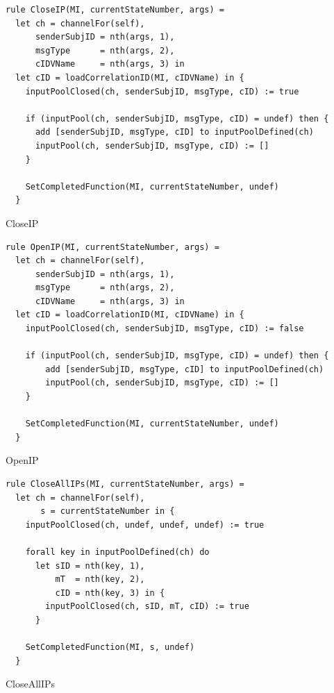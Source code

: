 \begin{listing}[H]
\begin{verbatim}
rule CloseIP(MI, currentStateNumber, args) =
  let ch = channelFor(self),
      senderSubjID = nth(args, 1),
      msgType      = nth(args, 2),
      cIDVName     = nth(args, 3) in
  let cID = loadCorrelationID(MI, cIDVName) in {
    inputPoolClosed(ch, senderSubjID, msgType, cID) := true

    if (inputPool(ch, senderSubjID, msgType, cID) = undef) then {
      add [senderSubjID, msgType, cID] to inputPoolDefined(ch)
      inputPool(ch, senderSubjID, msgType, cID) := []
    }

    SetCompletedFunction(MI, currentStateNumber, undef)
  }
\end{verbatim}
\caption{CloseIP}
\label{lst:asm:CloseIP}
\end{listing}




\begin{listing}[H]
\begin{verbatim}
rule OpenIP(MI, currentStateNumber, args) =
  let ch = channelFor(self),
      senderSubjID = nth(args, 1),
      msgType      = nth(args, 2),
      cIDVName     = nth(args, 3) in
  let cID = loadCorrelationID(MI, cIDVName) in {
    inputPoolClosed(ch, senderSubjID, msgType, cID) := false

    if (inputPool(ch, senderSubjID, msgType, cID) = undef) then {
        add [senderSubjID, msgType, cID] to inputPoolDefined(ch)
        inputPool(ch, senderSubjID, msgType, cID) := []
    }

    SetCompletedFunction(MI, currentStateNumber, undef)
  }
\end{verbatim}
\caption{OpenIP}
\label{lst:asm:OpenIP}
\end{listing}




\begin{listing}[H]
\begin{verbatim}
rule CloseAllIPs(MI, currentStateNumber, args) =
  let ch = channelFor(self),
       s = currentStateNumber in {
    inputPoolClosed(ch, undef, undef, undef) := true

    forall key in inputPoolDefined(ch) do
      let sID = nth(key, 1),
          mT  = nth(key, 2),
          cID = nth(key, 3) in {
        inputPoolClosed(ch, sID, mT, cID) := true
      }

    SetCompletedFunction(MI, s, undef)
  }
\end{verbatim}
\caption{CloseAllIPs}
\label{lst:asm:CloseAllIPs}
\end{listing}




